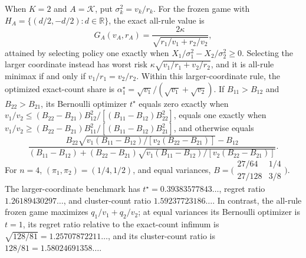 When \(K=2\) and \(A=\mathcal K\), put \(\sigma_k^2=v_k/r_k\).  For the frozen game with \(H_A=\{(d/2,-d/2):d\in\mathbb R\}\), the exact all-rule value is
\[
G_A(v_A,r_A)=\frac{2\kappa}{\sqrt{r_1/v_1+r_2/v_2}},
\]
attained by selecting policy one exactly when \(X_1/\sigma_1^2-X_2/\sigma_2^2\geq0\).  Selecting the larger coordinate instead has worst risk \(\kappa\sqrt{v_1/r_1+v_2/r_2}\), and it is all-rule minimax if and only if \(v_1/r_1=v_2/r_2\).  Within this larger-coordinate rule, the optimized exact-count share is \(\alpha_1^\star=\sqrt{v_1}/(\sqrt{v_1}+\sqrt{v_2})\). If \(B_{11}>B_{12}\) and \(B_{22}>B_{21}\), its Bernoulli optimizer \(t^\star\) equals zero exactly when \(v_1/v_2\leq(B_{22}-B_{21})B_{12}^2/[(B_{11}-B_{12})B_{22}^2]\), equals one exactly when \(v_1/v_2\geq(B_{22}-B_{21})B_{11}^2/[(B_{11}-B_{12})B_{21}^2]\), and otherwise equals
\[
\frac{B_{22}\sqrt{v_1(B_{11}-B_{12})/[v_2(B_{22}-B_{21})]}-B_{12}}{(B_{11}-B_{12})+(B_{22}-B_{21})\sqrt{v_1(B_{11}-B_{12})/[v_2(B_{22}-B_{21})]}}.
\]
For \(n=4\), \((\pi_1,\pi_2)=(1/4,1/2)\), and equal variances, \(B=\bigl(\begin{smallmatrix}27/64&1/4\\27/128&3/8\end{smallmatrix}\bigr)\).  The larger-coordinate benchmark has \(t^\star=0.39383577843\ldots\), regret ratio \(1.26189430297\ldots\), and cluster-count ratio \(1.59237723186\ldots\).  In contrast, the all-rule frozen game maximizes \(q_1/v_1+q_2/v_2\); at equal variances its Bernoulli optimizer is \(t=1\), its regret ratio relative to the exact-count infimum is \(\sqrt{128/81}=1.25707872211\ldots\), and its cluster-count ratio is \(128/81=1.58024691358\ldots\).
